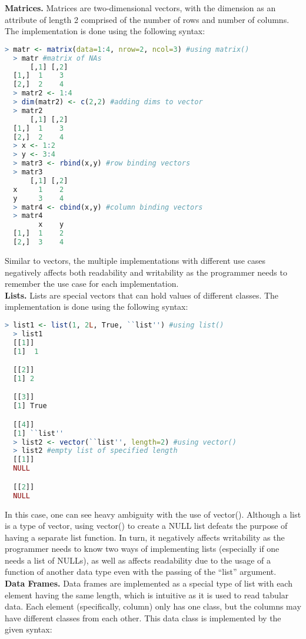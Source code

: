 \documentclass[12pt]{article}
\begin{document}
\textbf{Matrices.} Matrices are two-dimensional vectors, with the dimension as an attribute of length 2 comprised of the number of rows and number of columns. The implementation is done using the following syntax:

\begin{lstlisting}[language=R ]
  > matr <- matrix(data=1:4, nrow=2, ncol=3) #using matrix()
  > matr #matrix of NAs
      [,1] [,2]
  [1,]  1    3
  [2,]  2    4
  > matr2 <- 1:4
  > dim(matr2) <- c(2,2) #adding dims to vector
  > matr2
      [,1] [,2]
  [1,]  1    3
  [2,]  2    4
  > x <- 1:2
  > y <- 3:4
  > matr3 <- rbind(x,y) #row binding vectors
  > matr3
      [,1] [,2]
  x     1    2
  y     3    4
  > matr4 <- cbind(x,y) #column binding vectors
  > matr4
        x    y
  [1,]  1    2
  [2,]  3    4
\end{lstlisting}

Similar to vectors, the multiple implementations with different use cases negatively affects both readability and writability as the programmer needs to remember the use case for each implementation.\\

\textbf{Lists.} Lists are special vectors that can hold values of different classes. The implementation is done using the following syntax:

\begin{lstlisting}[language=R ]
  > list1 <- list(1, 2L, True, ``list'') #using list()
  > list1
  [[1]]
  [1]  1

  [[2]]
  [1] 2

  [[3]]
  [1] True

  [[4]]
  [1] ``list''
  > list2 <- vector(``list'', length=2) #using vector()
  > list2 #empty list of specified length
  [[1]]
  NULL

  [[2]]
  NULL
\end{lstlisting}

In this case, one can see heavy ambiguity with the use of vector(). Although a list is a type of vector, using vector() to create a NULL list defeats the purpose of having a separate list function. In turn, it negatively affects writability as the programmer needs to know two ways of implementing lists (especially if one needs a list of NULLs), as well as affects readability due to the usage of a function of another data type even with the passing of the ``list'' argument.\\

\textbf{Data Frames.} Data frames are implemented as a special type of list with each element having the same length, which is intuitive as it is used to read tabular data. Each element (specifically, column) only has one class, but the columns may have different classes from each other. This data class is implemented by the given syntax:
\end{document}
